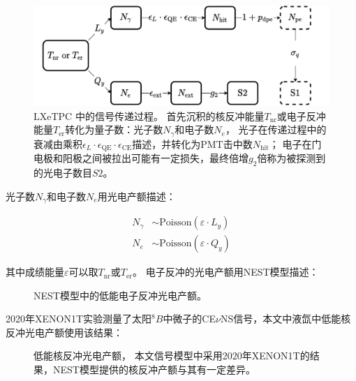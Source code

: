 \begin{figure}
    \centering
    \includegraphics[width=1.0\linewidth]{figures/signal_flow.pdf}
    \caption{\label{fig:signal_flow} LXeTPC 中的信号传递过程。
    首先沉积的核反冲能量$T_{\mathrm{nr}}$或电子反冲能量$T_{\mathrm{er}}$转化为量子数：光子数$N_\gamma$和电子数$N_e$，
    光子在传递过程中的衰减由乘积$\epsilon_L\cdot\epsilon_\mathrm{QE}\cdot\epsilon_\mathrm{CE}$描述，并转化为PMT击中数$N_\mathrm{hit}$；
    电子在门电极和阳极之间被拉出可能有一定损失，最终倍增$g_2$倍称为被探测到的光电子数目$S2$。}
\end{figure}

光子数$N_\gamma$和电子数$N_e$用光电产额描述：

\begin{align}
    \label{eq:N_ge_lq}
    N_\gamma &\sim \mathrm{Poisson}\left(\varepsilon\cdot L_y\right) \\
    N_e &\sim \mathrm{Poisson}\left(\varepsilon\cdot Q_y\right)
\end{align}

其中成绩能量$\varepsilon$可以取$T_{\mathrm{nr}}$或$T_{\mathrm{er}}$。
电子反冲的光电产额用NEST模型描述：

\begin{figure}
    \centering
    
    \caption{\label{fig:lxe_er_yield} NEST模型中的低能电子反冲光电产额\cite{lenardo_global_2015,jason_brodsky_chris_tunnell_mszydagis_jbalajth_vetri_velan_junying_huang_2019}。}
\end{figure}

2020年XENON1T实验测量了太阳${}^{8}B$中微子的CE$\nu$NS信号\cite{aprile_search_2021}，本文中液氙中低能核反冲光电产额使用该结果：

\begin{figure}
    \centering
    
    \caption{\label{fig:lxe_nr_yield} 低能核反冲光电产额\cite{aprile_search_2021,jason_brodsky_chris_tunnell_mszydagis_jbalajth_vetri_velan_junying_huang_2019}，
    本文信号模型中采用2020年XENON1T的结果，NEST模型提供的核反冲产额与其有一定差异。}
\end{figure}

